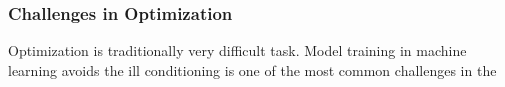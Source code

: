 \subsubsection{Challenges in Optimization}

Optimization is traditionally very difficult task. Model training in machine learning avoids 
the ill conditioning is one of the most common challenges in the 